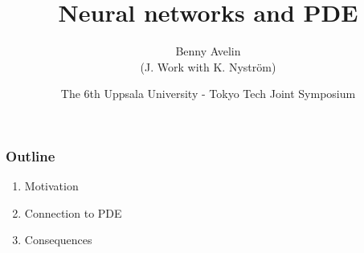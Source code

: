 \documentclass[10pt]{beamer}
\def \englishtitle {Neural networks and PDE}
\begin{document}
\title{\englishtitle}
\author[Avelin]{Benny Avelin \\
	(J. Work with K. Nyström)}
\date[Uppsala-Tokyo Tech] %
{The 6th Uppsala University - Tokyo Tech Joint Symposium}

\begin{frame} %
\titlepage
\end{frame}

\begin{frame} %
	\frametitle{Outline}
	\begin{enumerate}
		\item Motivation
		\item Connection to PDE
		\item Consequences
	\end{enumerate}
\end{frame}
\end{document}
